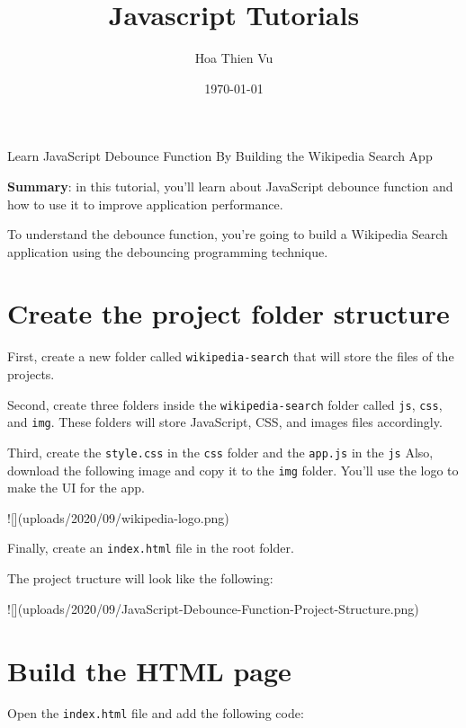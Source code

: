 \documentclass[11pt]{article}
\title{\textbf{Javascript Tutorials}}
\author{Hoa Thien Vu}
\date{\today}
\begin{document}
\maketitle

{\huge Learn JavaScript Debounce Function By Building the Wikipedia Search App}

\begin{displayquote}
\textbf{Summary}: in this tutorial, you'll learn about JavaScript debounce 
function and how to use it to improve application performance.
\end{displayquote}

\noindent
To understand the debounce function, you're going to build a Wikipedia
Search application using the debouncing programming technique.

\section*{Create the project folder structure}

First, create a new folder called \verb|wikipedia-search| that will store
the files of the projects.
\newline

\noindent
Second, create three folders inside the \verb|wikipedia-search| folder called
\verb|js|, \verb|css|, and \verb|img|. These folders will store JavaScript, CSS, and
images files accordingly.
\newline

\noindent
Third, create the \verb|style.css| in the \verb|css| folder and the \verb|app.js| in
the \verb|js| Also, download the following image and copy it to the \verb|img|
folder. You'll use the logo to make the UI for the app.

![](uploads/2020/09/wikipedia-logo.png)

\noindent
Finally, create an \verb|index.html| file in the root folder.
\newline

\noindent
The project tructure will look like the following:

![](uploads/2020/09/JavaScript-Debounce-Function-Project-Structure.png)

\section*{Build the HTML page}

Open the \verb|index.html| file and add the following code:
\end{document}
